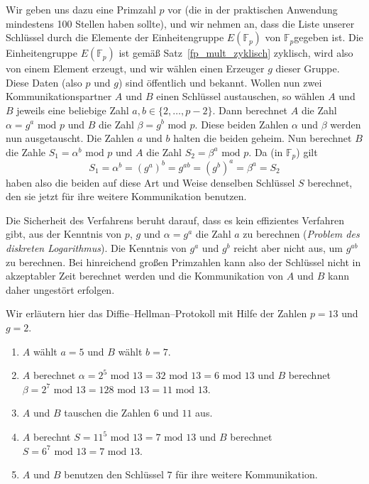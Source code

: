 Wir geben uns dazu eine Primzahl $p$ vor (die in der praktischen Anwendung mindestens 100 Stellen haben sollte), 
und wir nehmen an, dass die Liste unserer Schlüssel durch die Elemente der 
Einheitengruppe $E(\mathbb F_p)$ von $\mathbb F_p$gegeben ist.
Die Einheitengruppe $E(\mathbb F_p)$ ist gemäß Satz~\ref{fp_mult_zyklisch} zyklisch, wird also von einem 
Element erzeugt, und wir wählen einen Erzeuger $g$ dieser Gruppe. Diese Daten (also $p$ und $g$) sind 
öffentlich und bekannt. Wollen nun zwei Kommunikationspartner $A$ und $B$ einen Schlüssel austauschen, 
so wählen $A$ und $B$ jeweils eine beliebige Zahl $a, b \in \{2, \ldots , p-2\}$. Dann berechnet $A$ die Zahl
$\alpha = g^a \textrm{ mod } p$ und $B$ die Zahl $\beta = g^b \textrm{ mod } p$. Diese beiden Zahlen 
$\alpha$ und $\beta$ werden nun ausgetauscht. Die Zahlen $a$ und $b$ halten die beiden geheim. Nun berechnet 
$B$ die Zahle $S_1 = \alpha^{b}  \textrm{ mod } p$ und $A$ die Zahl $S_2 = \beta^{a}  \textrm{ mod } p$. 
Da (in $\mathbb F_p$) gilt
  	$$ S_1 = \alpha^b = \left(g^a\right)^b =  g^{ab} = \left(g^b\right)^a = \beta^a = S_2 $$
haben also die beiden auf diese Art und Weise denselben Schlüssel $S$ berechnet, den sie jetzt für 
ihre weitere Kommunikation benutzen. 

Die Sicherheit des Verfahrens beruht darauf, dass es kein effizientes Verfahren gibt, aus der Kenntnis von 
$p$, $g$ und $\alpha = g^a$ die Zahl $a$ zu berechnen (\textit{Problem des diskreten Logarithmus}). Die Kenntnis 
von $g^a$ und $g^b$ reicht aber nicht aus, um $g^{ab}$ zu berechnen.  Bei hinreichend 
großen Primzahlen kann also der Schlüssel nicht in akzeptabler Zeit berechnet werden und die Kommunikation 
von $A$ und $B$ kann daher ungestört erfolgen.

\begin{beispiel} Wir erläutern hier das Diffie--Hellman--Protokoll mit Hilfe der Zahlen $p = 13$ und $g = 2$.

\begin{enumerate}
\item $A$ wählt $a = 5$ und $B$ wählt $b = 7$.
\item $A$ berechnet $\alpha = 2^5 \textrm{ mod } 13 = 32 \textrm{ mod } 13  = 6 \textrm{ mod } 13 $ und $B$ 
berechnet $\beta = 2^7 \textrm{ mod } 13 = 128 \textrm{ mod } 13 = 11 \textrm{ mod } 13$.
\item $A$ und $B$ tauschen die Zahlen $6$ und $11$ aus.
\item $A$ berechnt $S = 11^5 \textrm{ mod } 13 = 7 \textrm{ mod } 13$ und $B$ berechnet 
$S = 6^7 \textrm{ mod } 13 = 7 \textrm{ mod } 13$.
\item $A$ und $B$ benutzen den Schlüssel $7$ für ihre weitere Kommunikation.
\end{enumerate}
\end{beispiel}